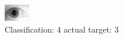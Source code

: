 \begin{figure}[h!]
\begin{center}
\includegraphics[width=0.60\columnwidth]{figures/ID1832_class_4_target_3.png}
\end{center}
\caption{ Classification: 4 actual target: 3}
\label{fig:ID1832_class_4_target_3}
\end{figure}
